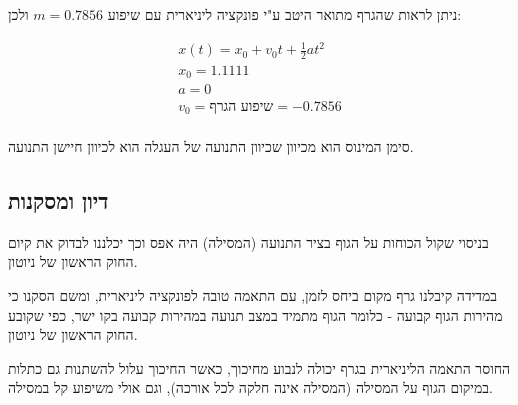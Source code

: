 \documentclass[14pt]{extarticle}
\begin{document}
ניתן לראות שהגרף מתואר היטב ע"י פונקציה ליניארית עם שיפוע $m=0.7856$ ולכן:
\begin{center}
\begin{equation}
\begin{aligned}
    x(t) = x_0 + v_0 t + \frac{1}{2} a t^2 \\
    x_0 = 1.1111 \\
    a = 0 \\
    v_0 = \textbf{שיפוע הגרף} = -0.7856 \\
\end{aligned}
\end{equation}
\end{center}
סימן המינוס הוא מכיוון שכיוון התנועה של העגלה הוא לכיוון חיישן התנועה.

\subsection{דיון ומסקנות}
בניסוי שקול הכוחות על הגוף בציר התנועה (המסילה) היה אפס וכך יכלננו לבדוק את קיום החוק הראשון של ניוטון.

במדידה קיבלנו גרף מקום ביחס לזמן, עם התאמה טובה לפונקציה ליניארית,  ומשם הסקנו כי מהירות הגוף קבועה - כלומר הגוף מתמיד במצב תנועה במהירות קבועה בקו ישר, כפי שקובע החוק הראשון של ניוטון.

החוסר התאמה הליניארית בגרף יכולה לנבוע מחיכוך, כאשר החיכוך עלול להשתנות גם כתלות במיקום הגוף על המסילה (המסילה אינה חלקה לכל אורכה), וגם אולי משיפוע קל במסילה.
\end{document}
